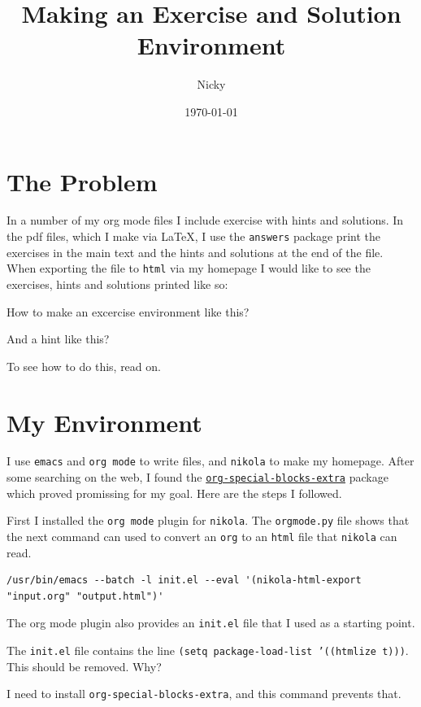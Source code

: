 \documentclass[a4paper]{article}
\author{Nicky}
\date{\today}
\title{Making an Exercise and Solution Environment}
\begin{document}
\maketitle
\section{The Problem}
\label{sec:org13ad8cf}

In a number of my org mode files I include exercise with hints and solutions.
In the pdf files, which I make via \LaTeX, I use the \texttt{answers} package print the exercises in the main text and the hints and solutions at the end of the file.
When exporting the file to \texttt{html} via my homepage I would like to see the exercises, hints and solutions printed like so:

\begin{exercise}
How to make an excercise environment like this?
\begin{hint}
And a hint like this?
\end{hint}
\begin{solution}
To see how to do this, read on.
\end{solution}
\end{exercise}
\section{My Environment}
\label{sec:org1a6fb2f}

I use \texttt{emacs} and \texttt{org mode} to write files, and \texttt{nikola} to make my homepage.
After some searching on the web, I found the \href{http://alhassy.com/org-special-block-extras/}{\texttt{org-special-blocks-extra}} package which proved promissing for my goal.
Here are the steps I followed.

First I installed the \texttt{org mode} plugin for \texttt{nikola}. The \texttt{orgmode.py} file shows that the next command can used to convert an \texttt{org} to an \texttt{html} file that \texttt{nikola} can read.
\begin{verbatim}
/usr/bin/emacs --batch -l init.el --eval '(nikola-html-export "input.org" "output.html")'
\end{verbatim}
The org mode plugin also provides an \texttt{init.el} file that I used as a starting point.

\begin{exercise}
The \texttt{init.el} file contains the line \texttt{(setq package-load-list '((htmlize t)))}. This should be removed. Why?
\begin{solution}
I need to install \texttt{org-special-blocks-extra}, and this command prevents that.
\end{solution}
\end{exercise}
\end{document}
